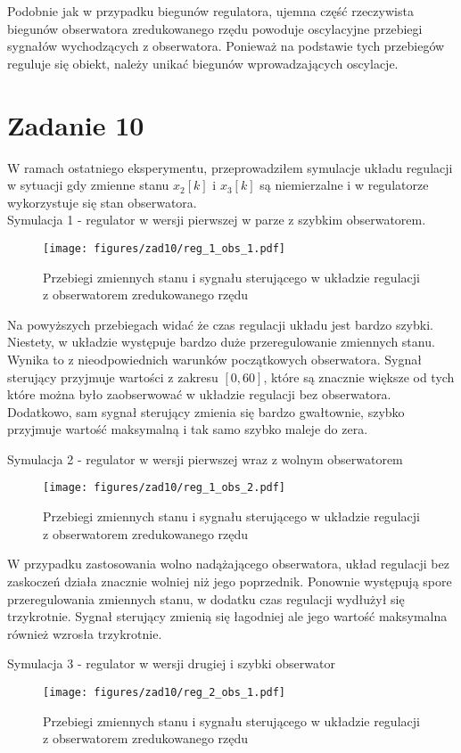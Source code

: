 \documentclass[a4paper,titlepage,11pt,floatssmall]{mwrep}
\begin{document}
Podobnie jak w przypadku biegunów regulatora, ujemna część rzeczywista biegunów obserwatora zredukowanego rzędu powoduje oscylacyjne przebiegi sygnałów wychodzących z obserwatora. Ponieważ na podstawie tych przebiegów reguluje się obiekt, należy unikać biegunów wprowadzających oscylacje. 
\newpage
\section{Zadanie 10}
\indent W ramach ostatniego eksperymentu, przeprowadziłem symulacje układu regulacji w sytuacji gdy zmienne stanu $x_2[k]$ i $x_3[k]$ są niemierzalne i w regulatorze wykorzystuje się stan obserwatora.
\\ \bigskip
\indent Symulacja 1 - regulator w wersji pierwszej w parze z  szybkim obserwatorem.

\begin{figure}[H]
\centering
\texttt{[image: figures/zad10/reg\_1\_obs\_1.pdf]}
\caption{Przebiegi zmiennych stanu i sygnału sterującego w układzie regulacji z obserwatorem zredukowanego rzędu}
\end{figure}

Na powyższych przebiegach widać że czas regulacji układu jest bardzo szybki. Niestety, w układzie występuje bardzo duże przeregulowanie zmiennych stanu. Wynika to z nieodpowiednich warunków początkowych obserwatora. Sygnał sterujący przyjmuje wartości z zakresu $[0,60]$, które są znacznie większe od tych które można było zaobserwować w układzie regulacji bez obserwatora.
Dodatkowo, sam sygnał sterujący zmienia się bardzo gwałtownie, szybko przyjmuje wartość maksymalną i tak samo szybko maleje do zera.
\newpage

\indent Symulacja 2 - regulator w wersji pierwszej wraz z wolnym obserwatorem
\begin{figure}[H]
\centering
\texttt{[image: figures/zad10/reg\_1\_obs\_2.pdf]}
\caption{Przebiegi zmiennych stanu i sygnału sterującego w układzie regulacji z obserwatorem zredukowanego rzędu}
\end{figure}

W przypadku zastosowania wolno nadążającego obserwatora, układ regulacji bez zaskoczeń działa znacznie wolniej niż jego poprzednik. Ponownie występują spore przeregulowania zmiennych stanu, w dodatku czas regulacji wydłużył się trzykrotnie. Sygnał sterujący zmienią się łagodniej ale jego wartość maksymalna również wzrosła trzykrotnie.
\newpage
 
\indent Symulacja 3 - regulator w wersji drugiej i szybki  obserwator
\begin{figure}[H]
\centering
\texttt{[image: figures/zad10/reg\_2\_obs\_1.pdf]}
\caption{Przebiegi zmiennych stanu i sygnału sterującego w układzie regulacji z obserwatorem zredukowanego rzędu}
\end{figure}
\end{document}
